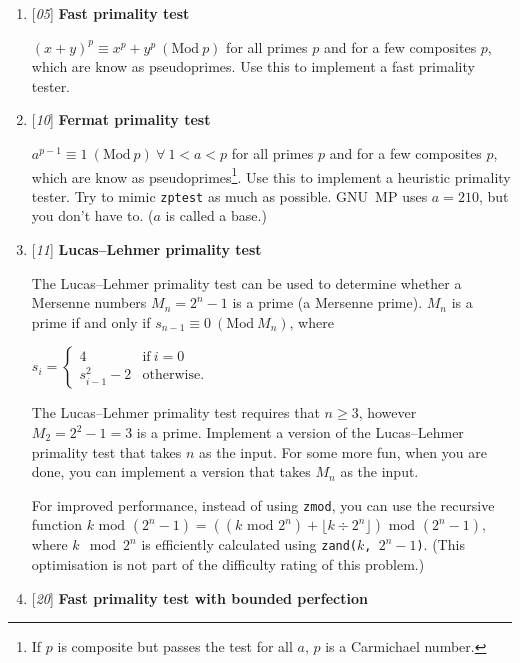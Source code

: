 \begin{enumerate}[label=\textbf{\arabic*}.]
\item {[\textit{05}]} \textbf{Fast primality test}

$(x + y)^p \equiv x^p + y^p ~(\text{Mod}~p)$
for all primes $p$ and for a few composites $p$,
which are know as pseudoprimes. Use this to implement
a fast primality tester.



\item {[\textit{10}]} \textbf{Fermat primality test}

$a^{p - 1} \equiv 1 ~(\text{Mod}~p) ~\forall~ 1 < a < p$
for all primes $p$ and for a few composites $p$,
which are know as pseudoprimes\footnote{If $p$ is composite
but passes the test for all $a$, $p$ is a Carmichael
number.}. Use this to implement a heuristic primality
tester. Try to mimic \texttt{zptest} as much as possible.
GNU~MP uses $a = 210$, but you don't have to. ($a$ is
called a base.)



\item {[\textit{11}]} \textbf{Lucas–Lehmer primality test}

The Lucas–Lehmer primality test can be used to determine
whether a Mersenne numbers $M_n = 2^n - 1$ is a prime (a
Mersenne prime). $M_n$ is a prime if and only if
$s_{n - 1} \equiv 0 ~(\text{Mod}~M_n)$, where

\( \displaystyle{
    s_i = \left \{ \begin{array}{ll}
      4 & \text{if} ~ i = 0 \\
      s_{i - 1}^2 - 2 & \text{otherwise}.
    \end{array} \right .
}\)

\noindent
The Lucas–Lehmer primality test requires that $n \ge 3$,
however $M_2 = 2^2 - 1 = 3$ is a prime. Implement a version
of the Lucas–Lehmer primality test that takes $n$ as the
input. For some more fun, when you are done, you can
implement a version that takes $M_n$ as the input.

For improved performance, instead of using \texttt{zmod},
you can use the recursive function
%
\( \displaystyle{
    k \text{ mod } (2^n - 1) =
    \left (
      (k \text{ mod } 2^n) + \lfloor k \div 2^n \rfloor
    \right ) \text{ mod } (2^n - 1),
}\)
%
where $k \mod 2^n$ is efficiently calculated
using \texttt{zand($k$, $2^n - 1$)}. (This optimisation
is not part of the difficulty rating of this problem.)



\item {[\textit{20}]} \textbf{Fast primality test with bounded perfection}


\end{enumerate}

